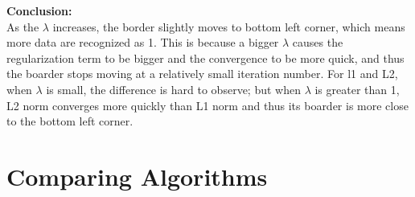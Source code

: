 \documentclass{article}
\begin{document}
	\newpage
	\noindent
	\textbf{Conclusion: }\\
	As the $\lambda$ increases, the border slightly moves to bottom left corner, which means more data are recognized as 1. This is because a bigger $\lambda$ causes the regularization term to be bigger and the convergence to be more quick, and thus the boarder stops moving at a relatively small iteration number. For l1 and L2, when $\lambda$ is small, the difference is hard to observe; but when $\lambda$ is greater than 1, L2 norm converges more quickly than L1 norm and thus its boarder is more close to the bottom left corner.
	
	
	
	
    \section{Comparing Algorithms} 
\end{document}
